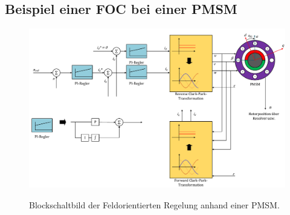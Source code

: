 \begin{landscape}
\subsection{Beispiel einer FOC bei einer PMSM}
\begin{figure}[h!]
	\includegraphics[scale=0.7]{_Bilder/blockschaltbild-foc.pdf}
	\label{fig:foc-dc-ac}
	\caption{Blockschaltbild der Feldorientierten Regelung anhand einer PMSM.}
\end{figure}
\end{landscape}


